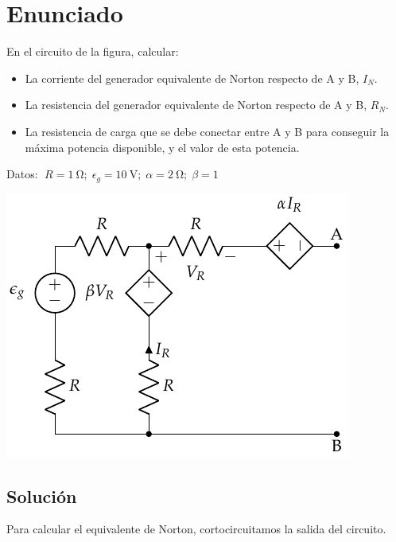 
\newpage

\section{Enunciado}

En el circuito de la figura, calcular:
\begin{itemize}
\item La corriente del generador equivalente de Norton respecto de A y
  B, $I_N$.
\item La resistencia del generador equivalente de Norton respecto de A
  y B, $R_N$.
\item La resistencia de carga que se debe conectar entre A y B para
  conseguir la máxima potencia disponible, y el valor de esta
  potencia.
\end{itemize}

Datos: $\; R = \qty{1}{\ohm};\; \epsilon_g = \qty{10}{\volt};\; \alpha = \qty{2}{\ohm};\; \beta = 1$

\begin{center}
  
  \vspace{-3mm} 
  \includegraphics{figuras/norton.pdf}
\end{center}

\vspace{-5mm} 
\subsection*{Solución}
Para calcular el equivalente de Norton, cortocircuitamos la salida del circuito. 


